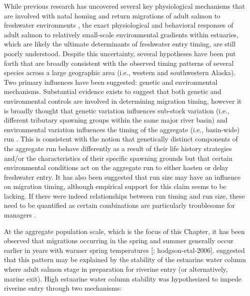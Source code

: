 \documentclass[12pt,]{book}
\theoremstyle{definition}
\theoremstyle{definition}
\theoremstyle{definition}
\theoremstyle{remark}
\begin{document}
While previous research has uncovered several key physiological
mechanisms that are involved with natal homing
\citep{hasler-scholz-1983} and return migrations of adult salmon to
freshwater environments
\citep{cooperman-etal-2010, cooke-etal-2008, hinch-etal-2012}, the exact
physiological and behavioral responses of adult salmon to relatively
small-scale environmental gradients within estuaries, which are likely
the ultimate determinants of freshwater entry timing, are still poorly
understood. Despite this uncertainty, several hypotheses have been put
forth that are broadly consistent with the observed timing patterns of
several species across a large geographic area (i.e., western and
southwestern Alaska). Two primary influences have been suggested:
genetic \citep{quinn-etal-2000, anderson-beer-2009, omalley-etal-2010}
and environmental \citep{hodgson-etal-2006, keefer-etal-2008}
mechanisms. Substantial evidence exists to suggest that both genetic and
environmental controls are involved in determining migration timing,
however it is broadly thought that genetic variation influences
sub-stock variation (i.e., different tributary spawning groups within
the same major river basin) and environmental variation influences the
timing of the aggregate (i.e., basin-wide) run
\citep{keefer-etal-2008, anderson-beer-2009}. This is consistent with
the notion that genetically distinct components of the aggregate run
behave differently as a result of their life history strategies and/or
the characteristics of their specific spawning grounds
\citetext{\citealp[e.g., sub-stocks that must travel farther in-river to
reach spawning grounds enter freshwater
earlier;][]{clark-etal-2015}; \citealp[sub-stocks that spawn in
tributaries influenced by warmer lakes enable later
spawning;][]{burger-etal-1985}} but that certain environmental
conditions act on the aggregate run to either hasten or delay freshwater
entry. It has also been suggested that run size may have an influence on
migration timing, although empirical support for this claim seems to be
lacking. If there were indeed relationships between run timing and run
size, these need to be quantified as certain combinations are
particularly troublesome for managers \citep[e.g., small/early runs and
large/late runs appear the same early
in-season;][]{adkison-cunningham-2015}.

At the aggregate population scale, which is the focus of this Chapter,
it has been observed that migrations occurring in the spring and summer
generally occur earlier in years with warmer spring temperatures
{[}\citet{mundy-evenson-2011}; hodgson-etal-2006{]}.
\citet{mundy-evenson-2011} suggested that this pattern may be explained
by the stability of the estuarine water column where adult salmon stage
in preparation for riverine entry (or alternatively, marine exit). High
estuarine water column stability was hypothesized to impede riverine
entry through two mechanisms:
\end{document}

